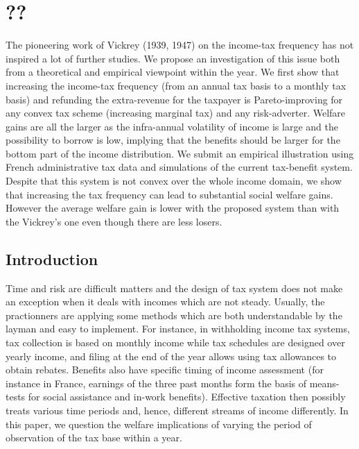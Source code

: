 
\ifx\isEmbedded\undefined


\graphicspath{{figures/}}

\setcounter{chapter}{6}
\chapter{\label{??} ??}
\else \fi

\noindent 

The pioneering work of Vickrey (1939, 1947) on the income-tax
frequency has not inspired a lot of further studies. We propose an
investigation of this issue both from a theoretical and empirical viewpoint
within the year. We first show that increasing the income-tax frequency (from
an annual tax basis to a monthly tax basis) and refunding the extra-revenue
for the taxpayer is Pareto-improving for any convex tax scheme (increasing
marginal tax) and any risk-adverter. Welfare gains are all the larger as the
infra-annual volatility of income is large and the possibility to borrow is
low, implying that the benefits should be larger for the bottom part of the
income distribution. We submit an empirical illustration using French
administrative tax data and simulations of the current tax-benefit system.
Despite that this system is not convex over the whole income domain, we show
that increasing the tax frequency can lead to substantial social welfare gains. 
However the average welfare gain is lower with the proposed system than with the Vickrey's one even though there are less losers.



\newpage
\section{Introduction}

Time and risk are difficult matters and the design of tax system does not make
an exception when it deals with incomes which are not steady. Usually, the
practionners are applying some methods which are both understandable by the
layman and easy to implement. For instance, in withholding income tax systems,
tax collection is based on monthly income while tax schedules are designed
over yearly income, and filing at the end of the year allows using tax
allowances to obtain rebates. Benefits also have specific timing of income
assessment (for instance in France, earnings of the three past months form the
basis of means-tests for social assistance and in-work benefits). Effective
taxation then possibly treats various time periods and, hence, different
streams of income differently. In this paper, we question the welfare
implications of varying the period of observation of the tax base within a year.

